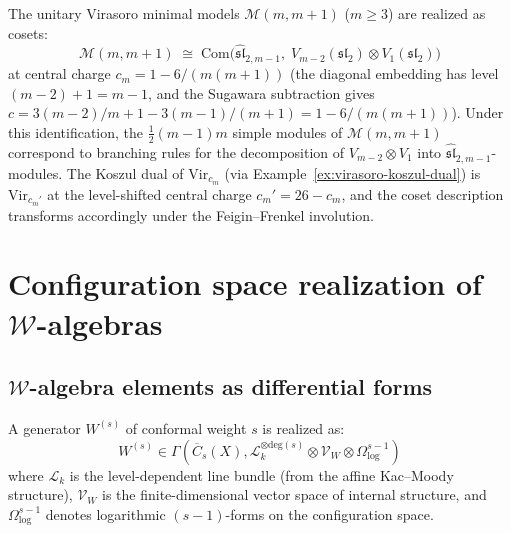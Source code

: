 \begin{example}
\label{ex:minimal-coset}
The unitary Virasoro minimal models $\mathcal{M}(m, m{+}1)$
($m \geq 3$) are realized as cosets:
\begin{equation}\label{eq:minimal-coset}
\mathcal{M}(m, m{+}1) \;\cong\;
\mathrm{Com}\bigl(\widehat{\mathfrak{sl}}_{2,m-1},\;
V_{m-2}(\mathfrak{sl}_2) \otimes V_1(\mathfrak{sl}_2)\bigr)
\end{equation}
at central charge $c_m = 1 - 6/(m(m{+}1))$
(the diagonal embedding has level $(m{-}2) + 1 = m{-}1$,
and the Sugawara subtraction gives
$c = 3(m{-}2)/m + 1 - 3(m{-}1)/(m{+}1) = 1 - 6/(m(m{+}1))$).
Under this identification, the $\tfrac{1}{2}(m{-}1)m$ simple
modules of $\mathcal{M}(m, m{+}1)$ correspond to branching
rules for the decomposition of $V_{m-2} \otimes V_1$ into
$\widehat{\mathfrak{sl}}_{2,m-1}$-modules.  The Koszul dual of
$\mathrm{Vir}_{c_m}$ (via
Example~\textup{\ref{ex:virasoro-koszul-dual}}) is
$\mathrm{Vir}_{c_m'}$ at the level-shifted central charge
$c_m' = 26 - c_m$, and the coset description transforms
accordingly under the Feigin--Frenkel involution.
\end{example}

\section{Configuration space realization of $\mathcal{W}$-algebras}

\subsection{$\mathcal{W}$-algebra elements as differential forms}

\begin{construction}
A generator $W^{(s)}$ of conformal weight $s$ is realized as:
\begin{equation}
W^{(s)} \in \Gamma\left(\overline{C}_s(X), \mathcal{L}_k^{\otimes \text{deg}(s)} \otimes \mathcal{V}_{W} \otimes \Omega^{s-1}_{\log}\right)
\end{equation}
where $\mathcal{L}_k$ is the level-dependent line bundle (from the affine Kac--Moody structure), $\mathcal{V}_W$ is the finite-dimensional vector space of internal structure, and $\Omega^{s-1}_{\log}$ denotes logarithmic $(s-1)$-forms on the configuration space.
\end{construction}

